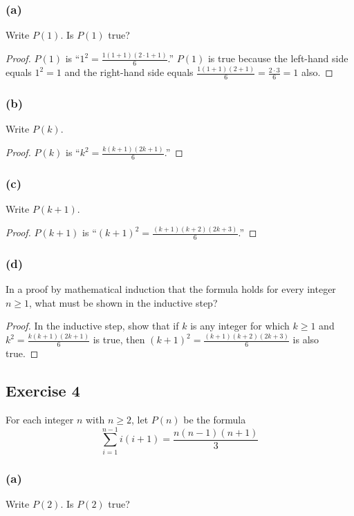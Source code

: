\documentclass[14pt]{extarticle}
\newcommand{\dps}{\displaystyle}
\begin{document}
\subsubsection{(a)}
Write $P(1)$. Is $P(1)$ true?

\begin{proof}
$P(1)$ is ``$1^2 = \frac{1(1+1)(2\cdot 1 + 1)}{6}$.'' $P(1)$ is true because the left-hand side equals $1^2 = 1$ and the right-hand side equals $\frac{1(1+1)(2 + 1)}{6} = \frac{2 \cdot 3}{6} = 1$ also.
\end{proof}

\subsubsection{(b)}
Write $P(k)$.

\begin{proof}
$P(k)$ is ``$\dps k^2 = \frac{k(k+1)(2k + 1)}{6}$.''
\end{proof}

\subsubsection{(c)}
Write $P(k + 1)$.

\begin{proof}
$P(k+1)$ is ``$\dps (k+1)^2 = \frac{(k+1)(k+2)(2k + 3)}{6}$.''
\end{proof}

\subsubsection{(d)}
In a proof by mathematical induction that the formula holds for every integer $n \geq 1$, what must be shown in the inductive step?

\begin{proof}
In the inductive step, show that if $k$ is any integer for which $k \geq 1$ and $\dps k^2 = \frac{k(k+1)(2k + 1)}{6}$ is true, then $\dps (k+1)^2 = \frac{(k+1)(k+2)(2k + 3)}{6}$ is also true.
\end{proof}

\subsection{Exercise 4}
For each integer $n$ with $n \geq 2$, let $P(n)$ be the formula
\[
\sum_{i=1}^{n-1}i(i+1) = \frac{n(n-1)(n+1)}{3}
\]
\subsubsection{(a)}
Write $P(2)$. Is $P(2)$ true?
\end{document}
